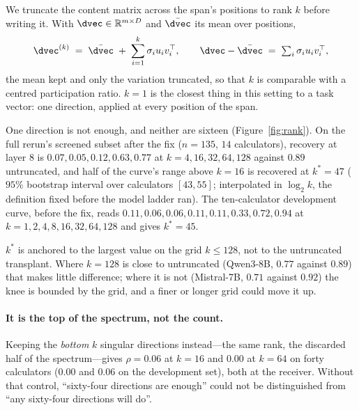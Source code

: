 We truncate the content matrix across the span's positions to rank $k$ before
writing it. With $\dvec \in \mathbb{R}^{m \times D}$ and $\bar{\dvec}$ its mean
over positions,
\begin{equation}
\dvec^{(k)} \;=\; \bar{\dvec} \;+\; \sum_{i=1}^{k} \sigma_i u_i v_i^{\top},
\qquad
\dvec - \bar{\dvec} \;=\; \textstyle\sum_i \sigma_i u_i v_i^{\top},
\end{equation}
the mean kept and only the variation truncated, so that $k$ is comparable with a
centred participation ratio. $k=1$ is the closest thing in this setting to a
task vector: one direction, applied at every position of the span.

One direction is not enough, and neither are sixteen
(Figure~\ref{fig:rank}). On the full rerun's screened subset after the fix
($n=135$, $14$ calculators), recovery
at layer $8$ is $0.07, 0.05, 0.12, 0.63, 0.77$ at $k = 4, 16, 32, 64, 128$
against $0.89$ untruncated, and half of the curve's range above $k=16$ is
recovered at $k^{*}=47$ ($95\%$ bootstrap interval over calculators $[43, 55]$;
interpolated in $\log_2 k$, the definition fixed before the model ladder ran).
The ten-calculator development curve, before the fix, reads
$0.11, 0.06, 0.06, 0.11, 0.11, 0.33, 0.72, 0.94$ at $k = 1,2,4,8,16,32,64,128$
and gives $k^{*}=45$.

$k^{*}$ is anchored to the largest value on the grid $k \le 128$, not to the
untruncated transplant. Where $k=128$ is close to untruncated (Qwen3-8B, $0.77$
against $0.89$) that makes little difference; where it is not (Mistral-7B,
$0.71$ against $0.92$) the knee is bounded by the grid, and a finer or longer
grid could move it up.

\paragraph{It is the top of the spectrum, not the count.} Keeping the
\emph{bottom} $k$ singular directions instead---the same rank, the discarded
half of the spectrum---gives $\rho = 0.06$ at $k=16$ and $0.00$ at $k=64$ on
forty calculators ($0.00$ and $0.06$ on the development set), both at the
receiver. Without that control, ``sixty-four directions are enough'' could not
be distinguished from ``any sixty-four directions will do''.

